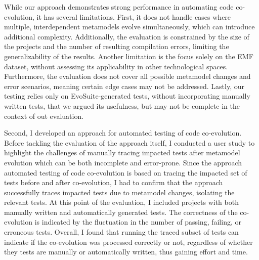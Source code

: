 

While our approach demonstrates strong performance in automating code co-evolution, it has several limitations. First, it does not handle cases where multiple, interdependent metamodels evolve simultaneously, which can introduce additional complexity. Additionally, the evaluation is constrained by the size of the projects and the number of resulting compilation errors, limiting the generalizability of the results. Another limitation is the focus solely on the EMF dataset, without assessing its applicability in other technological spaces. Furthermore, the evaluation does not cover all possible metamodel changes and error scenarios, meaning certain edge cases may not be addressed. Lastly, our testing relies only on EvoSuite-generated tests, without incorporating manually written tests, that we argued its usefulness, but may not be complete in the context of out evaluation.



Second, I developed an approach for automated testing of code co-evolution. 
Before tackling the evaluation of the approach itself, I conducted a user study to highlight the challenges of manually tracing impacted tests after metamodel evolution which can be both incomplete and error-prone. Since the approach automated testing of code co-evolution is based on tracing the impacted set of tests before and after co-evolution, I had to confirm that the approach successfully traces impacted tests due to metamodel changes, isolating the relevant tests. At this point of the evaluation, I included projects with both manually written and automatically generated tests. The correctness of the co-evolution is indicated by the fluctuation in the number of passing, failing, or erroneous tests. Overall, I found that running the traced subset of tests can indicate if the co-evolution was processed correctly or not, regardless of whether they tests are manually or automatically written, thus gaining effort and time.

